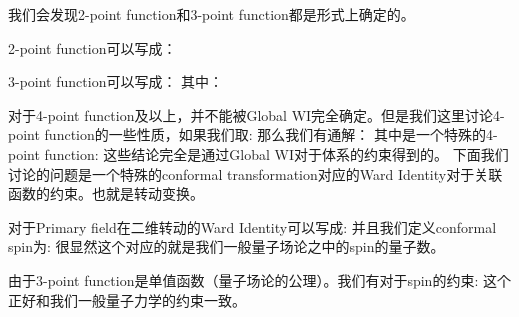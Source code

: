 我们会发现2-point function和3-point function都是形式上确定的。

2-point function可以写成：

3-point function可以写成：
其中：

对于4-point function及以上，并不能被Global WI完全确定。但是我们这里讨论4-point function的一些性质，如果我们取:
那么我们有通解：
其中是一个特殊的4-point function:
这些结论完全是通过Global WI对于体系的约束得到的。
\line
下面我们讨论的问题是一个特殊的conformal transformation对应的Ward Identity对于关联函数的约束。也就是转动变换。

对于Primary field在二维转动的Ward Identity可以写成:
并且我们定义conformal spin为:
很显然这个对应的就是我们一般量子场论之中的spin的量子数。

由于3-point function是单值函数（量子场论的公理）。我们有对于spin的约束:
这个正好和我们一般量子力学的约束一致。

